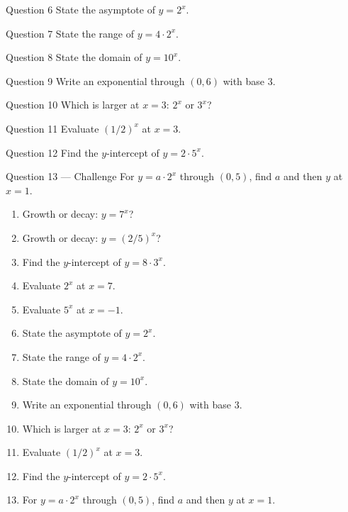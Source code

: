 \documentclass[11pt]{article}
\begin{document}
\begin{qbox}{Question 6}
State the asymptote of $y=2^{x}$.\workspace{2.4cm}
\end{qbox}

\begin{qbox}{Question 7}
State the range of $y=4\cdot2^{x}$.\workspace{2.4cm}
\end{qbox}

\begin{qbox}{Question 8}
State the domain of $y=10^{x}$.\workspace{2.4cm}
\end{qbox}

\begin{qbox}{Question 9}
Write an exponential through $(0,6)$ with base $3$.\workspace{2.4cm}
\end{qbox}

\begin{qbox}{Question 10}
Which is larger at $x=3$: $2^{x}$ or $3^{x}$?\workspace{2.4cm}
\end{qbox}

\begin{qbox}{Question 11}
Evaluate $(1/2)^{x}$ at $x=3$.\workspace{2.4cm}
\end{qbox}

\begin{qbox}{Question 12}
Find the $y$-intercept of $y=2\cdot5^{x}$.\workspace{2.4cm}
\end{qbox}

\begin{qbox}{Question 13 --- Challenge}
For $y=a\cdot2^{x}$ through $(0,5)$, find $a$ and then $y$ at $x=1$.\workspace{3cm}
\end{qbox}

\clearpage
{}

\begin{recapbox}
\begin{multicols}{2}
\small
\begin{enumerate}[leftmargin=*,itemsep=3pt]
  \item Growth or decay: $y=7^{x}$?
  \item Growth or decay: $y=(2/5)^{x}$?
  \item Find the $y$-intercept of $y=8\cdot3^{x}$.
  \item Evaluate $2^{x}$ at $x=7$.
  \item Evaluate $5^{x}$ at $x=-1$.
  \item State the asymptote of $y=2^{x}$.
  \item State the range of $y=4\cdot2^{x}$.
  \item State the domain of $y=10^{x}$.
  \item Write an exponential through $(0,6)$ with base $3$.
  \item Which is larger at $x=3$: $2^{x}$ or $3^{x}$?
  \item Evaluate $(1/2)^{x}$ at $x=3$.
  \item Find the $y$-intercept of $y=2\cdot5^{x}$.
  \item For $y=a\cdot2^{x}$ through $(0,5)$, find $a$ and then $y$ at $x=1$.
\end{enumerate}
\end{multicols}
\end{recapbox}
\end{document}
